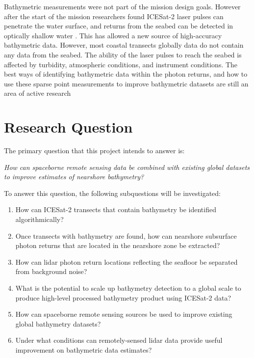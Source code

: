 Bathymetric measurements were not part of the mission design goals. However after the start of the mission researchers found ICESat-2 laser pulses can penetrate the water surface, and returns from the seabed can be detected in optically shallow water \parencite{Parrish2019}. This has allowed a new source of high-accuracy bathymetric data. However, most coastal transects globally data do not contain any data from the seabed. The ability of the laser pulses to reach the seabed is affected by turbidity, atmospheric conditions, and instrument conditions. The best ways of identifying bathymetric data within the photon returns, and how to use these sparse point measurements to improve bathymetric datasets are still an area of active research

\section{Research Question}
The primary question that this project intends to answer is:

\emph{How can spaceborne remote sensing data be combined with existing global datasets to improve estimates of nearshore bathymetry?}

To answer this question, the following subquestions will be investigated:


\begin{enumerate}
      \item How can ICESat-2 transects that contain bathymetry be identified algorithmically?
      \item Once transects with bathymetry are found, how can nearshore subsurface photon returns that are located in the nearshore zone be extracted?
      \item How can lidar photon return locations reflecting the seafloor be separated from background noise?
      \item What is the potential to scale up bathymetry detection to a global scale to produce high-level processed bathymetry product using ICESat-2 data?
      \item How can spaceborne remote sensing sources be used to improve existing global bathymetry datasets?
      \item Under what conditions can remotely-sensed lidar data provide useful improvement on bathymetric data estimates?
\end{enumerate}
